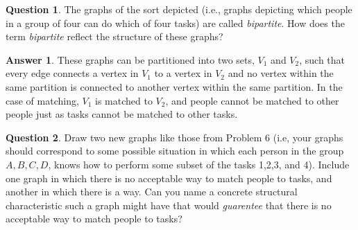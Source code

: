 \documentclass[article, 12pt]{article}
\theoremstyle{definition}
\newtheorem{question}{Question}
\newtheorem{answer}{Answer}
\begin{document}
    \begin{question}
        The graphs of the sort depicted (i.e., graphs depicting which people in a group of four can do which of four tasks) are called \textit{bipartite}. How does the term \textit{bipartite} reflect the structure of these graphs?
    \end{question}
    \begin{answer}
        These graphs can be partitioned into two sets, $V_1$ and $V_2$, such that every edge connects a vertex in $V_1$ to a vertex in $V_2$ and no vertex within the same partition is connected to another vertex within the same partition. In the case of matching, $V_1$ is matched to $V_2$, and people cannot be matched to other people just as tasks cannot be matched to other tasks.
    \end{answer}
    \begin{question}
        Draw two new graphs like those from Problem 6 (i.e, your graphs should correspond to some possible situation in which each person in the group $A, B, C, D$, knows how to perform some subset of the tasks 1,2,3, and 4). Include one graph in which there is no acceptable way to match people to tasks, and another in which there is a way. Can you name a concrete structural characteristic such a graph might have that would \textit{guarentee} that there is no acceptable way to match people to tasks?
    \end{question}
\end{document}
